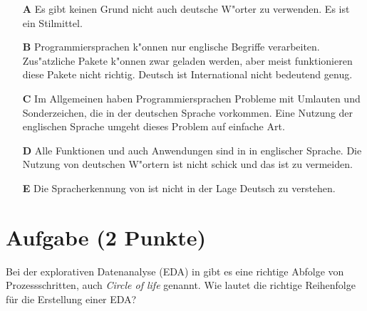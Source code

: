 \documentclass[a4paper, 9pt]{scrartcl}\usepackage[]{graphicx}\usepackage[]{xcolor}
\begin{document}
\begin{enumerate}
\item [\textbf{A} \msquare] Es gibt keinen Grund nicht auch deutsche W{"o}rter zu verwenden. Es ist ein Stilmittel.
\item [\textbf{B} \msquare] Programmiersprachen k{"o}nnen nur englische Begriffe verarbeiten. Zus{"a}tzliche Pakete k{"o}nnen zwar geladen werden, aber meist funktionieren diese Pakete nicht richtig. Deutsch ist International nicht bedeutend genug.
\item [\textbf{C} \msquare] Im Allgemeinen haben Programmiersprachen Probleme mit Umlauten und Sonderzeichen, die in der deutschen Sprache vorkommen. Eine Nutzung der englischen Sprache umgeht dieses Problem auf einfache Art.
\item [\textbf{D} \msquare] Alle Funktionen und auch Anwendungen sind in \Rlogo in englischer Sprache. Die Nutzung von deutschen W{"o}rtern ist nicht schick und das ist zu vermeiden.
\item [\textbf{E} \msquare] Die Spracherkennung von \Rlogo ist nicht in der Lage Deutsch zu verstehen.
\end{enumerate}

\section{Aufgabe \hfill (2 Punkte)}

Bei der explorativen Datenanalyse (EDA) in \Rlogo gibt es eine richtige Abfolge von Prozessschritten, auch \textit{Circle of life} genannt. Wie lautet die richtige Reihenfolge f{\"u}r die Erstellung einer EDA?
\end{document}

